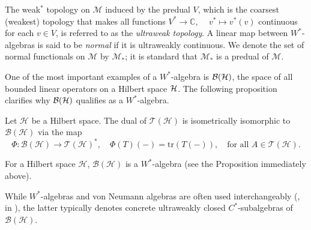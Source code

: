 \begin{definition}
  The weak\(^*\) topology on \(  \mathscr{M} \) induced by the predual $V$, which is the coarsest (weakest) topology  that makes all functions
\(
V^*\to \mathbb{C}, \,
\quad v^* \mapsto v^*(v)
\)
continuous for each \( v \in V \), is referred to as the \emph{ultraweak topology}. A linear map between \( W^* \)-algebras 
is said to be \emph{normal} if it is ultraweakly continuous.
We denote the set of normal functionals on \(  \mathscr{M} \) by \(  \mathscr{M}_* \); it is standard that \(  \mathscr{M}_* \) is a predual of \(  \mathscr{M} \).
\end{definition}

One of the most important examples of a $W^*$-algebra is $\mathcal{B}(\mathcal{H})$, the space of all bounded linear operators on a Hilbert space $\mathcal{H}$. The following proposition clarifies why \( \mathcal{B}(\mathcal{H}) \) qualifies as a \( W^* \)-algebra.

\begin{proposition} \cite[Theorem 19.2]{conwayCourseOperatorTheory2000}
  Let \(\mathcal{H}\) be a Hilbert space.
    The dual of \(\mathcal{T}(\mathcal{H})\) is isometrically isomorphic to \(\mathcal{B}(\mathcal{H})\) via the map
    \[
    \Phi : \mathcal{B}(\mathcal{H}) \to \mathcal{T}(\mathcal{H})^*, \quad \Phi(T)(-) = \mathrm{tr}(T(-)), \quad \text{for all } A \in \mathcal{T}(\mathcal{H}).
    \]
\end{proposition}

\begin{example}

  For a Hilbert space $\mathcal{H}$, $\mathcal{B}(\mathcal{H})$ is a $W^*$-algebra (see the Proposition immediately above).
\end{example}

\begin{remark}
  While $W^*$-algebras and von Neumann algebras are often used interchangeably (\eg, in \cite{westerbaanCategoryNeumannAlgebras2019}), the latter typically denotes concrete ultraweakly closed $C^*$-subalgebras of $\mathcal{B}(\mathcal{H})$.
\end{remark}

